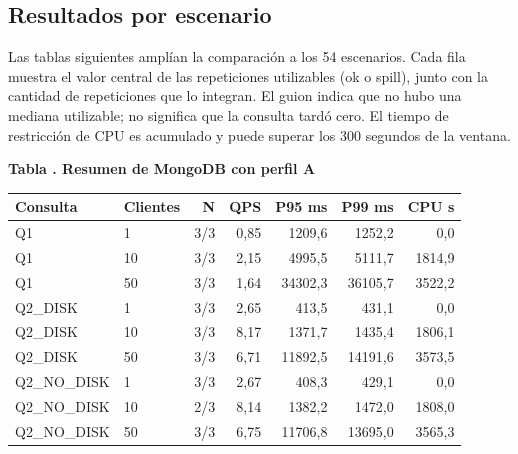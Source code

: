 \documentclass[12pt,letterpaper]{article}
\begin{document}
\subsection*{Resultados por escenario}
Las tablas siguientes amplían la comparación a los 54 escenarios. Cada fila muestra el valor central de las repeticiones utilizables (ok o spill), junto con la cantidad de repeticiones que lo integran. El guion indica que no hubo una mediana utilizable; no significa que la consulta tardó cero. El tiempo de restricción de CPU es acumulado y puede superar los 300 segundos de la ventana.
\par\begin{minipage}{\textwidth}\begin{center}\textbf{Tabla \thetable. Resumen de MongoDB con perfil A}\par\small\begin{tabular}{llrrrrr}\toprule Consulta & Clientes & N & QPS & P95 ms & P99 ms & CPU s \\ \midrule
Q1 & 1 & 3/3 & 0,85 & 1209,6 & 1252,2 & 0,0 \\
Q1 & 10 & 3/3 & 2,15 & 4995,5 & 5111,7 & 1814,9 \\
Q1 & 50 & 3/3 & 1,64 & 34302,3 & 36105,7 & 3522,2 \\
Q2\_DISK & 1 & 3/3 & 2,65 & 413,5 & 431,1 & 0,0 \\
Q2\_DISK & 10 & 3/3 & 8,17 & 1371,7 & 1435,4 & 1806,1 \\
Q2\_DISK & 50 & 3/3 & 6,71 & 11892,5 & 14191,6 & 3573,5 \\
Q2\_NO\_DISK & 1 & 3/3 & 2,67 & 408,3 & 429,1 & 0,0 \\
Q2\_NO\_DISK & 10 & 2/3 & 8,14 & 1382,2 & 1472,0 & 1808,0 \\
Q2\_NO\_DISK & 50 & 3/3 & 6,75 & 11706,8 & 13695,0 & 3565,3 \\
\bottomrule\end{tabular}\end{center}\end{minipage}\par
\end{document}
